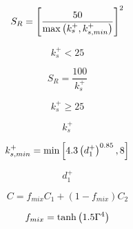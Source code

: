 {\newpage\clearpage
{}%
\begin{displaymath}
S_R = \left[ \frac{50}{{\rm max} \left(k_s^+, k_{s, min}^+ \right) } \right]^2
\end{displaymath}%
\lthtmldisplayZ
\lthtmlcheckvsize\clearpage}

{\newpage\clearpage
{}%
\begin{displaymath}
k_s^+ < 25
\end{displaymath}%
\lthtmldisplayZ
\lthtmlcheckvsize\clearpage}

{\newpage\clearpage
{}%
\begin{displaymath}
S_R = \frac{100}{k_s^+}
\end{displaymath}%
\lthtmldisplayZ
\lthtmlcheckvsize\clearpage}

{\newpage\clearpage
{}%
\begin{displaymath}
k_s^+ \geq 25
\end{displaymath}%
\lthtmldisplayZ
\lthtmlcheckvsize\clearpage}

{\newpage\clearpage
{}%
\begin{displaymath}
k_s^+ 
\end{displaymath}%
\lthtmldisplayZ
\lthtmlcheckvsize\clearpage}

{\newpage\clearpage
{}%
\begin{displaymath}
k_{s, min}^+ = {\rm min} \left[ 4.3 \left(d_1^+ \right)^{0.85}, 8 \right]
\end{displaymath}%
\lthtmldisplayZ
\lthtmlcheckvsize\clearpage}

{\newpage\clearpage
{}%
\begin{displaymath}
d_1^+
\end{displaymath}%
\lthtmldisplayZ
\lthtmlcheckvsize\clearpage}

{\newpage\clearpage
{}%
\begin{displaymath}
C = f_{mix} C_1 + \left(1-f_{mix}\right) C_2
\end{displaymath}%
\lthtmldisplayZ
\lthtmlcheckvsize\clearpage}

{\newpage\clearpage
{}%
\begin{displaymath}
f_{mix} = {\rm tanh} \left( 1.5 \Gamma^4 \right)
\end{displaymath}%
\lthtmldisplayZ
\lthtmlcheckvsize\clearpage}

